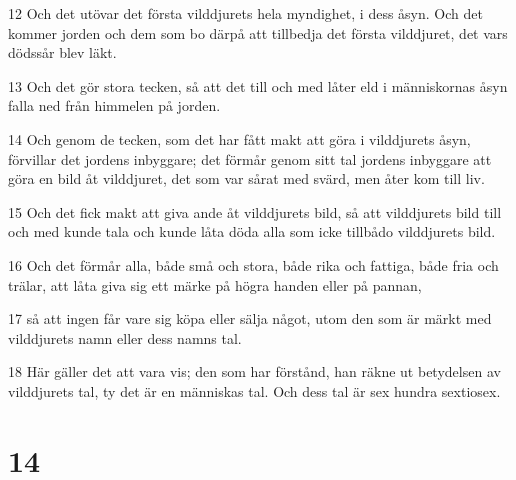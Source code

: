 \par 12 Och det utövar det första vilddjurets hela myndighet, i dess åsyn. Och det kommer jorden och dem som bo därpå att tillbedja det första vilddjuret, det vars dödssår blev läkt.
\par 13 Och det gör stora tecken, så att det till och med låter eld i människornas åsyn falla ned från himmelen på jorden.
\par 14 Och genom de tecken, som det har fått makt att göra i vilddjurets åsyn, förvillar det jordens inbyggare; det förmår genom sitt tal jordens inbyggare att göra en bild åt vilddjuret, det som var sårat med svärd, men åter kom till liv.
\par 15 Och det fick makt att giva ande åt vilddjurets bild, så att vilddjurets bild till och med kunde tala och kunde låta döda alla som icke tillbådo vilddjurets bild.
\par 16 Och det förmår alla, både små och stora, både rika och fattiga, både fria och trälar, att låta giva sig ett märke på högra handen eller på pannan,
\par 17 så att ingen får vare sig köpa eller sälja något, utom den som är märkt med vilddjurets namn eller dess namns tal.
\par 18 Här gäller det att vara vis; den som har förstånd, han räkne ut betydelsen av vilddjurets tal, ty det är en människas tal. Och dess tal är sex hundra sextiosex.

\chapter{14}

